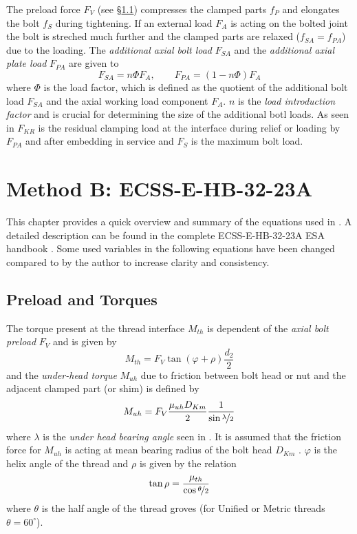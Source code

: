 The preload force $F_V$ (see §\ref{sec:preload}) compresses the clamped parts $f_P$ and elongates
the bolt $f_S$ during tightening. If an external load $F_A$ is acting on the bolted joint the bolt
is streched much further and the clamped parts are relaxed ($f_{SA}=f_{PA}$) due to the loading. 
The \emph{additional axial bolt load} $F_{SA}$ and the \emph{additional axial plate load}\footnotemark[1]
 $F_{PA}$ are given to
\begin{equation}
  F_{SA} = n \Phi F_A, \qquad F_{PA} = (1-n \Phi) F_A
  \label{equ:FSA_FPA}
\end{equation}
where $\Phi$ is the load factor, which is defined as the quotient of the additional bolt load $F_{SA}$ 
and the axial working load component $F_A$. $n$ is the \emph{load introduction factor} and is crucial
for determining the size of the additional botl loads. As seen in  $F_{KR}$ is the residual
clamping load at the interface during relief or loading by $F_{PA}$ and after embedding in service and 
$F_S$ is the maximum bolt load. 

\chapter{Method B: ECSS-E-HB-32-23A}
This chapter provides a quick overview and summary of the equations used in \bat. A detailed description
can be found in the complete ECSS-E-HB-32-23A ESA handbook \cite{ECSS_HB_32_23A}. Some used variables
in the following equations have been changed compared to \cite{ECSS_HB_32_23A} by the author to increase
clarity and consistency.

\section{Preload and Torques}
\label{sec:preload}
The torque present at the thread interface $M_{th}$ is dependent of the \emph{axial bolt preload} $F_V$ 
and is given by
\begin{equation}
  M_{th} = F_V \tan(\varphi+\rho)\frac{d_2}{2}
\end{equation}
and the \emph{under-head torque} $M_{uh}$ due to friction between bolt head or nut and the adjacent 
clamped part (or shim) is defined by
\begin{equation}
  M_{uh} = F_V \frac{\mu_{uh} D_{Km}}{2} \frac{1}{\sin{\nicefrac{\lambda}{2}}}
  \label{equ:Muh}
\end{equation}
where $\lambda$ is the \emph{under head bearing angle} seen in .
It is assumed that the friction force for $M_{uh}$ is acting at mean bearing radius of the bolt head 
$D_{Km}$ . $\varphi$ is the helix angle of the thread and $\rho$ is given by the relation
\begin{equation}
  \tan\rho = \frac{\mu_{th}}{\cos\nicefrac{\theta}{2}}
\end{equation}
where $\theta$ is the half angle of the thread groves (for Unified or Metric threads $\theta=60^\circ$).

